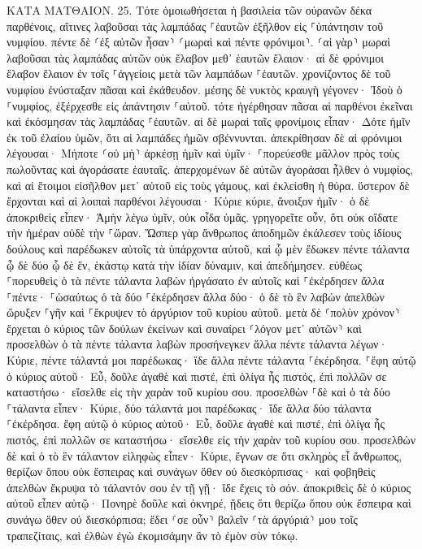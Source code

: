\documentclass[twoside, 9pt]{extreport}
\begin{document}
ΚΑΤΑ ΜΑΤΘΑΙΟΝ.
25.
Τότε ὁμοιωθήσεται ἡ βασιλεία τῶν οὐρανῶν δέκα παρθένοις, αἵτινες λαβοῦσαι τὰς λαμπάδας ⸀ἑαυτῶν ἐξῆλθον εἰς ⸀ὑπάντησιν τοῦ νυμφίου. 
πέντε δὲ ⸂ἐξ αὐτῶν ἦσαν⸃ ⸂μωραὶ καὶ πέντε φρόνιμοι⸃. 
⸂αἱ γὰρ⸃ μωραὶ λαβοῦσαι τὰς λαμπάδας αὐτῶν οὐκ ἔλαβον μεθ᾽ ἑαυτῶν ἔλαιον· 
αἱ δὲ φρόνιμοι ἔλαβον ἔλαιον ἐν τοῖς ⸀ἀγγείοις μετὰ τῶν λαμπάδων ⸀ἑαυτῶν. 
χρονίζοντος δὲ τοῦ νυμφίου ἐνύσταξαν πᾶσαι καὶ ἐκάθευδον. 
μέσης δὲ νυκτὸς κραυγὴ γέγονεν· Ἰδοὺ ὁ ⸀νυμφίος, ἐξέρχεσθε εἰς ἀπάντησιν ⸀αὐτοῦ. 
τότε ἠγέρθησαν πᾶσαι αἱ παρθένοι ἐκεῖναι καὶ ἐκόσμησαν τὰς λαμπάδας ⸀ἑαυτῶν. 
αἱ δὲ μωραὶ ταῖς φρονίμοις εἶπαν· Δότε ἡμῖν ἐκ τοῦ ἐλαίου ὑμῶν, ὅτι αἱ λαμπάδες ἡμῶν σβέννυνται. 
ἀπεκρίθησαν δὲ αἱ φρόνιμοι λέγουσαι· Μήποτε ⸂οὐ μὴ⸃ ἀρκέσῃ ἡμῖν καὶ ὑμῖν· ⸀πορεύεσθε μᾶλλον πρὸς τοὺς πωλοῦντας καὶ ἀγοράσατε ἑαυταῖς. 
ἀπερχομένων δὲ αὐτῶν ἀγοράσαι ἦλθεν ὁ νυμφίος, καὶ αἱ ἕτοιμοι εἰσῆλθον μετ᾽ αὐτοῦ εἰς τοὺς γάμους, καὶ ἐκλείσθη ἡ θύρα. 
ὕστερον δὲ ἔρχονται καὶ αἱ λοιπαὶ παρθένοι λέγουσαι· Κύριε κύριε, ἄνοιξον ἡμῖν· 
ὁ δὲ ἀποκριθεὶς εἶπεν· Ἀμὴν λέγω ὑμῖν, οὐκ οἶδα ὑμᾶς. 
γρηγορεῖτε οὖν, ὅτι οὐκ οἴδατε τὴν ἡμέραν οὐδὲ τὴν ⸀ὥραν. 
Ὥσπερ γὰρ ἄνθρωπος ἀποδημῶν ἐκάλεσεν τοὺς ἰδίους δούλους καὶ παρέδωκεν αὐτοῖς τὰ ὑπάρχοντα αὐτοῦ, 
καὶ ᾧ μὲν ἔδωκεν πέντε τάλαντα ᾧ δὲ δύο ᾧ δὲ ἕν, ἑκάστῳ κατὰ τὴν ἰδίαν δύναμιν, καὶ ἀπεδήμησεν. εὐθέως 
⸀πορευθεὶς ὁ τὰ πέντε τάλαντα λαβὼν ἠργάσατο ἐν αὐτοῖς καὶ ⸀ἐκέρδησεν ἄλλα ⸀πέντε· 
⸀ὡσαύτως ὁ τὰ δύο ⸀ἐκέρδησεν ἄλλα δύο· 
ὁ δὲ τὸ ἓν λαβὼν ἀπελθὼν ὤρυξεν ⸀γῆν καὶ ⸀ἔκρυψεν τὸ ἀργύριον τοῦ κυρίου αὐτοῦ. 
μετὰ δὲ ⸂πολὺν χρόνον⸃ ἔρχεται ὁ κύριος τῶν δούλων ἐκείνων καὶ συναίρει ⸂λόγον μετ᾽ αὐτῶν⸃ 
καὶ προσελθὼν ὁ τὰ πέντε τάλαντα λαβὼν προσήνεγκεν ἄλλα πέντε τάλαντα λέγων· Κύριε, πέντε τάλαντά μοι παρέδωκας· ἴδε ἄλλα πέντε τάλαντα ⸀ἐκέρδησα. 
⸀ἔφη αὐτῷ ὁ κύριος αὐτοῦ· Εὖ, δοῦλε ἀγαθὲ καὶ πιστέ, ἐπὶ ὀλίγα ἦς πιστός, ἐπὶ πολλῶν σε καταστήσω· εἴσελθε εἰς τὴν χαρὰν τοῦ κυρίου σου. 
προσελθὼν ⸀δὲ καὶ ὁ τὰ δύο ⸀τάλαντα εἶπεν· Κύριε, δύο τάλαντά μοι παρέδωκας· ἴδε ἄλλα δύο τάλαντα ⸀ἐκέρδησα. 
ἔφη αὐτῷ ὁ κύριος αὐτοῦ· Εὖ, δοῦλε ἀγαθὲ καὶ πιστέ, ἐπὶ ὀλίγα ἦς πιστός, ἐπὶ πολλῶν σε καταστήσω· εἴσελθε εἰς τὴν χαρὰν τοῦ κυρίου σου. 
προσελθὼν δὲ καὶ ὁ τὸ ἓν τάλαντον εἰληφὼς εἶπεν· Κύριε, ἔγνων σε ὅτι σκληρὸς εἶ ἄνθρωπος, θερίζων ὅπου οὐκ ἔσπειρας καὶ συνάγων ὅθεν οὐ διεσκόρπισας· 
καὶ φοβηθεὶς ἀπελθὼν ἔκρυψα τὸ τάλαντόν σου ἐν τῇ γῇ· ἴδε ἔχεις τὸ σόν. 
ἀποκριθεὶς δὲ ὁ κύριος αὐτοῦ εἶπεν αὐτῷ· Πονηρὲ δοῦλε καὶ ὀκνηρέ, ᾔδεις ὅτι θερίζω ὅπου οὐκ ἔσπειρα καὶ συνάγω ὅθεν οὐ διεσκόρπισα; 
ἔδει ⸂σε οὖν⸃ βαλεῖν ⸂τὰ ἀργύριά⸃ μου τοῖς τραπεζίταις, καὶ ἐλθὼν ἐγὼ ἐκομισάμην ἂν τὸ ἐμὸν σὺν τόκῳ. 
\end{document}
